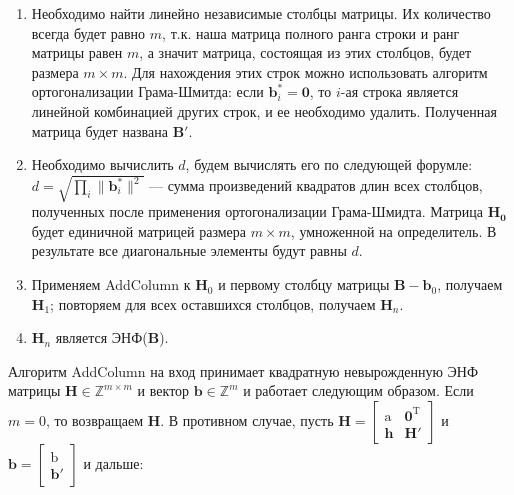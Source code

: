 \begin{enumerate}
\item Необходимо найти линейно независимые столбцы матрицы. Их количество всегда будет равно $ m $, т.к. наша матрица полного ранга строки и ранг матрицы равен $ m $, а значит матрица, состоящая из этих столбцов, будет размера $ m \times m $. Для нахождения этих строк можно использовать алгоритм ортогонализации Грама-Шмитда: если $ \mathbf{b}_i^*=\mathbf{0} $, то $ i $-ая строка является линейной комбинацией других строк, и ее необходимо удалить. Полученная матрица будет названа $  \mathbf{B}' $.
\item Необходимо вычислить $ d $, будем вычислять его по следующей форумле: $ d=\sqrt{\prod_i{\|\mathbf{b}_i^\ast\|^2}} $ --- сумма произведений квадратов длин всех столбцов, полученных после применения ортогонализации Грама-Шмидта. Матрица $ \mathbf{H}_\mathbf{0} $ будет единичной матрицей размера $ m \times m $, умноженной на определитель. В результате все диагональные элементы будут равны $ d $.
\item Применяем AddColumn к $ \mathbf{H}_0 $ и первому столбцу матрицы $ \mathbf{B} - \mathbf{b}_0 $, получаем $ \mathbf{H}_1 $; повторяем для всех оставшихся столбцов, получаем $ \mathbf{H}_n $.
\item $ \mathbf{H}_n $ является ЭНФ($ \mathbf{B} $).
\end{enumerate}

Алгоритм AddColumn на вход принимает квадратную невырожденную ЭНФ матрицы $ \mathbf{H} \in \mathbb{Z}^{m \times m} $ и вектор $ \mathbf{b} \in \mathbb{Z}^m $ и работает следующим образом. Если $ m = 0 $, то возвращаем $ \mathbf{H} $. В противном случае, пусть 
$ \mathbf{H} = \left[ \begin{array}{cccc}
\mathrm{a} & \mathbf{0}^\mathrm{T} \\
\mathbf{h} & \mathbf{H}' \end{array} \right] $ и 
$ \mathbf{b} = \left[ \begin{array}{cccc}
\mathrm{b} \\
\mathbf{b}' \end{array} \right] $ и дальше:

